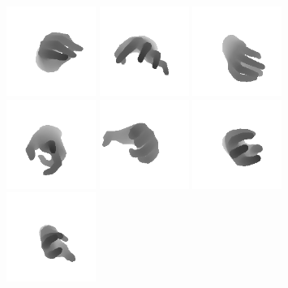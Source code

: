 \begin{figure}
    \includegraphics[width=110px]{figs/mano/14.png}
    \includegraphics[width=110px]{figs/mano/15.png}
    \includegraphics[width=110px]{figs/mano/16.png}
    \includegraphics[width=110px]{figs/mano/17.png}
    \includegraphics[width=110px]{figs/mano/18.png}
    \includegraphics[width=110px]{figs/mano/19.png}
    \includegraphics[width=110px]{figs/mano/20.png}

\end{figure}
